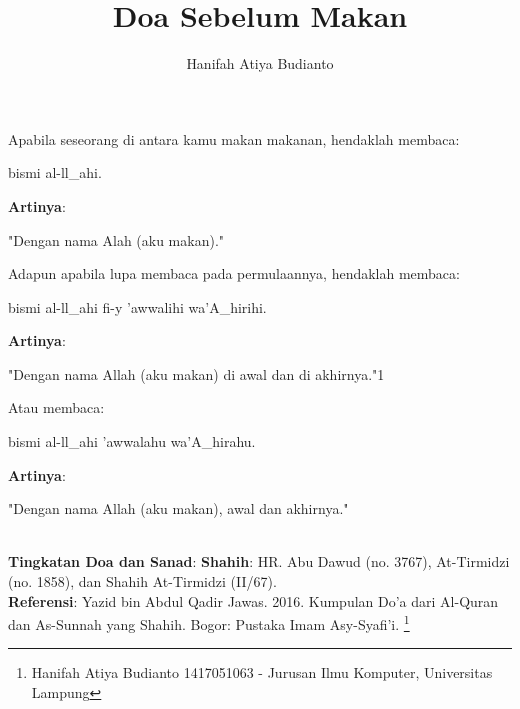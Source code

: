 \documentclass[a4paper,12pt]{article}
\title{\Large Doa Sebelum Makan}
\author{\calligra Hanifah Atiya Budianto}
\begin{document}
\sffamily
\maketitle 
\fullvocalize
{}
\par
\indent
Apabila seseorang di antara kamu makan makanan, hendaklah membaca:\\
\begin{arabtext}
\noindent
bismi al-ll_ahi.\\
\end{arabtext}
\noindent
\textbf{Artinya}:
\par
\indent
"Dengan nama Alah (aku makan)."\
\par
\indent
Adapun apabila lupa membaca pada permulaannya, hendaklah membaca:\\
\begin{arabtext}
\noindent
bismi al-ll_ahi fi-y 'awwalihi wa'A_hirihi.\\
\end{arabtext}
\noindent
\textbf{Artinya}:
\par
\indent
"Dengan nama Allah (aku makan) di awal dan di akhirnya."{\scriptsize 1}\\
\par
\indent
Atau membaca:
\begin{arabtext}
\noindent
bismi al-ll_ahi 'awwalahu wa'A_hirahu.\\
\end{arabtext}
\noindent
\textbf{Artinya}:
\par
\indent
"Dengan nama Allah (aku makan), awal dan akhirnya."\\\\
\par
\noindent
\textbf{Tingkatan Doa dan Sanad}: \textbf{Shahih}: HR. Abu Dawud (no. 
3767), At-Tirmidzi (no. 1858), dan Shahih At-Tirmidzi (II/67).\\
\textbf{Referensi}: Yazid bin Abdul Qadir Jawas. 2016. Kumpulan Do'a dari
Al-Quran dan As-Sunnah yang Shahih. Bogor: Pustaka Imam Asy-Syafi'i.
\index{sebelum}
\footnote{Hanifah Atiya Budianto 1417051063 - Jurusan Ilmu Komputer,
Universitas Lampung}
\end{document}
